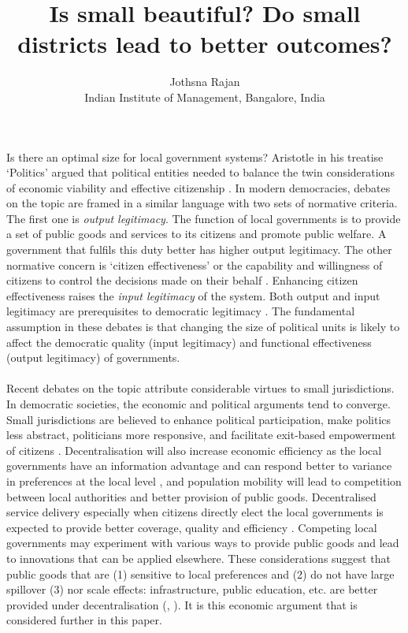 \documentclass[12pt, a4paper]{article}
\title{Is small beautiful? Do small districts lead to better outcomes?}
\author{Jothsna Rajan \\
	\small{Indian Institute of Management, Bangalore, India}}
\begin{document}

	\maketitle
\paragraph{} Is there an optimal size for local government systems? Aristotle in his treatise `Politics' argued that political entities needed to balance the twin considerations of economic viability and effective citizenship \parencite{aristotle_politics_1984}. In modern democracies, debates on the topic are framed in a similar language with two sets of normative criteria. The first one is \textit{output legitimacy}. The function of local governments is to provide a set of public goods and services to its citizens and promote public welfare. A government that fulfils this duty better has higher output legitimacy. The other normative concern is `citizen effectiveness' or the capability and willingness of citizens to control the decisions made on their behalf \parencite{dahl_size_1973}. Enhancing citizen effectiveness raises the \textit{input legitimacy} of the system. Both output and input legitimacy are prerequisites to democratic legitimacy \parencite{scharpf_governing_1999}. The fundamental assumption in these debates is that changing the size of political units is likely to affect the democratic quality (input legitimacy) and functional effectiveness (output legitimacy) of governments.
\paragraph{} Recent debates on the topic attribute considerable virtues to small jurisdictions. In democratic societies, the economic and political arguments tend to converge. Small jurisdictions are believed to enhance political participation, make politics less abstract, politicians more responsive, and facilitate exit-based empowerment of citizens \parencite{hansen_size_2014}. Decentralisation will also increase economic efficiency as the local governments have an information advantage and can respond better to variance in preferences at the local level \parencite{oates_fiscal_1972}, and population mobility will lead to competition between local authorities and better provision of public goods. Decentralised service delivery especially when citizens directly elect the local governments is expected to provide better coverage, quality and efficiency \parencite{smoke2015rethinking}. Competing local governments may experiment with various ways to provide public goods and lead to innovations that can be applied elsewhere. These considerations suggest that public goods that are (1) sensitive to local preferences and (2) do not have large spillover (3) nor scale effects: infrastructure, public education, etc. are better provided under decentralisation (\cite{tiebout_economies_1960}, \cite{oates_fiscal_1972}). It is this economic argument that is considered further in this paper.
\end{document}
